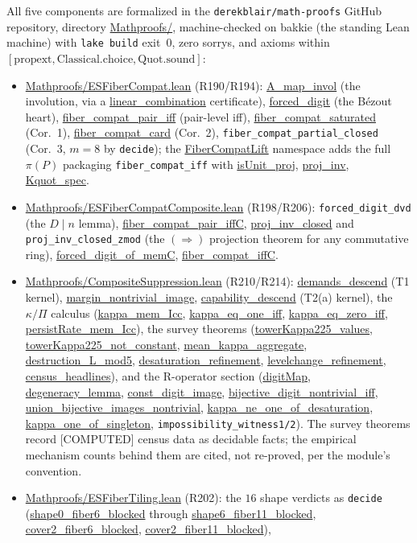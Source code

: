 \documentclass[11pt,a4paper]{article}
\theoremstyle{definition}
\begin{document}
All five components are formalized in the \texttt{derekblair/math-proofs}
GitHub repository, directory \url{Mathproofs/}, machine-checked on
bakkie (the standing Lean machine) with \texttt{lake build} exit~$0$,
zero sorrys, and axioms within
$[\mathrm{propext},\mathrm{Classical.choice},\mathrm{Quot.sound}]$:
\begin{itemize}
\item \url{Mathproofs/ESFiberCompat.lean} (R190/R194):
  \url{A_map_invol} (the involution, via a
  \url{linear_combination} certificate), \url{forced_digit} (the
  B\'ezout heart), \url{fiber_compat_pair_iff} (pair-level iff),
  \url{fiber_compat_saturated} (Cor.~1),
  \url{fiber_compat_card} (Cor.~2),
  \texttt{fiber\_compat\_partial\_closed} (Cor.~3, $m=8$ by
  \texttt{decide}); the \url{FiberCompatLift} namespace adds the full
  $\pi(P)$ packaging \texttt{fiber\_compat\_iff} with
  \url{isUnit_proj}, \url{proj_inv}, \url{Kquot_spec}.
\item \url{Mathproofs/ESFiberCompatComposite.lean} (R198/R206):
  \texttt{forced\_digit\_dvd} (the $D\mid n$ lemma), 
  \url{fiber_compat_pair_iffC}, \url{proj_inv_closed} and
  \texttt{proj\_inv\_closed\_zmod} (the $(\Rightarrow)$ projection
  theorem for any commutative ring), \url{forced_digit_of_memC},
  \url{fiber_compat_iffC}.
\item \url{Mathproofs/CompositeSuppression.lean} (R210/R214):
  \url{demands_descend} (T1 kernel),
  \url{margin_nontrivial_image}, \url{capability_descend}
  (T2(a) kernel), the $\kappa/\Pi$ calculus
  (\url{kappa_mem_Icc}, \url{kappa_eq_one_iff},
  \url{kappa_eq_zero_iff}, \url{persistRate_mem_Icc}),
  the survey theorems (\url{towerKappa225_values},
  \url{towerKappa225_not_constant},
  \url{mean_kappa_aggregate}, \url{destruction_L_mod5},
  \url{desaturation_refinement}, \url{levelchange_refinement},
  \url{census_headlines}), and the R-operator section
  (\url{digitMap}, \url{degeneracy_lemma},
  \url{const_digit_image},
  \url{bijective_digit_nontrivial_iff},
  \url{union_bijective_images_nontrivial},
  \url{kappa_ne_one_of_desaturation},
  \url{kappa_one_of_singleton},
  \texttt{impossibility\_witness1/2}). The survey theorems record
  [COMPUTED] census data as decidable facts; the empirical mechanism
  counts behind them are cited, not re-proved, per the module's
  convention.
\item \url{Mathproofs/ESFiberTiling.lean} (R202): the $16$ shape
  verdicts as \texttt{decide} (\url{shape0_fiber6_blocked}
  through \url{shape6_fiber11_blocked},
  \url{cover2_fiber6_blocked}, \url{cover2_fiber11_blocked}),

\end{itemize}
\end{document}
